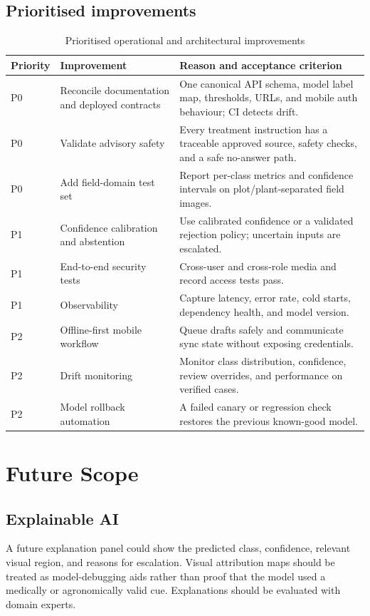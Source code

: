 \documentclass[12pt,a4paper,oneside,openany]{report}
\begin{document}
\clearpage
\section{Prioritised improvements}
\begin{table}[H]
\centering
\scriptsize
\caption{Prioritised operational and architectural improvements}\label{tab:prioritised-improvements}
\begin{tabular}{P{1.0cm}P{4.2cm}P{8.0cm}}
\toprule
\textbf{Priority} & \textbf{Improvement} & \textbf{Reason and acceptance criterion}\\
\midrule
P0 & Reconcile documentation and deployed contracts & One canonical API schema, model label map, thresholds, URLs, and mobile auth behaviour; CI detects drift.\\
P0 & Validate advisory safety & Every treatment instruction has a traceable approved source, safety checks, and a safe no-answer path.\\
P0 & Add field-domain test set & Report per-class metrics and confidence intervals on plot/plant-separated field images.\\
P1 & Confidence calibration and abstention & Use calibrated confidence or a validated rejection policy; uncertain inputs are escalated.\\
P1 & End-to-end security tests & Cross-user and cross-role media and record access tests pass.\\
P1 & Observability & Capture latency, error rate, cold starts, dependency health, and model version.\\
P2 & Offline-first mobile workflow & Queue drafts safely and communicate sync state without exposing credentials.\\
P2 & Drift monitoring & Monitor class distribution, confidence, review overrides, and performance on verified cases.\\
P2 & Model rollback automation & A failed canary or regression check restores the previous known-good model.\\
\bottomrule
\end{tabular}
\end{table}

\chapter{Future Scope}
\section{Explainable AI}
A future explanation panel could show the predicted class, confidence, relevant visual region, and reasons for escalation. Visual attribution maps should be treated as model-debugging aids rather than proof that the model used a medically or agronomically valid cue. Explanations should be evaluated with domain experts.
\end{document}
